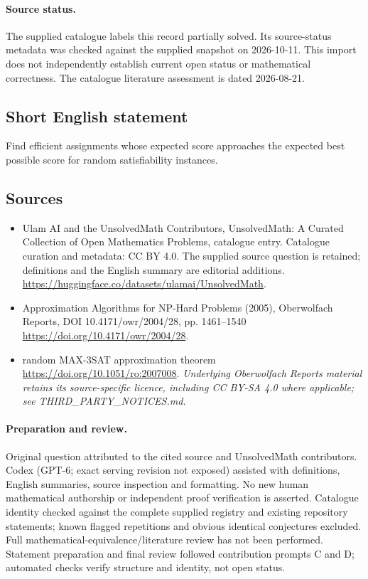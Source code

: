 \documentclass[11pt]{article}
\begin{document}
\paragraph{Source status.}
The supplied catalogue labels this record partially solved. Its source-status metadata was checked against the supplied snapshot on 2026-10-11. This import does not independently establish current open status or mathematical correctness. The catalogue literature assessment is dated 2026-08-21.
\subsection{Short English statement}
Find efficient assignments whose expected score approaches the expected best possible score for random satisfiability instances.
\subsection{Sources}
\begin{itemize}
\item[\hypertarget{source:statement:1}{S1}] Ulam AI and the UnsolvedMath Contributors, UnsolvedMath: A Curated Collection of Open Mathematics Problems, catalogue entry. Catalogue curation and metadata: CC BY 4.0. The supplied source question is retained; definitions and the English summary are editorial additions.
\url{https://huggingface.co/datasets/ulamai/UnsolvedMath}.
\item[\hypertarget{source:statement:2}{S2}] Approximation Algorithms for NP-Hard Problems (2005), Oberwolfach Reports, DOI 10.4171/owr/2004/28, pp. 1461--1540
\url{https://doi.org/10.4171/owr/2004/28}.
\item[\hypertarget{source:statement:3}{S3}] random MAX-3SAT approximation theorem
\url{https://doi.org/10.1051/ro:2007008}.
\textit{Underlying Oberwolfach Reports material retains its source-specific licence, including CC BY-SA 4.0 where applicable; see THIRD\_PARTY\_NOTICES.md.}
\end{itemize}
\paragraph{Preparation and review.}
Original question attributed to the cited source and UnsolvedMath contributors. Codex (GPT-6; exact serving revision not exposed) assisted with definitions, English summaries, source inspection and formatting. No new human mathematical authorship or independent proof verification is asserted. Catalogue identity checked against the complete supplied registry and existing repository statements; known flagged repetitions and obvious identical conjectures excluded. Full mathematical-equivalence/literature review has not been performed. Statement preparation and final review followed contribution prompts C and D; automated checks verify structure and identity, not open status.
\label{end:statement}
\end{document}
